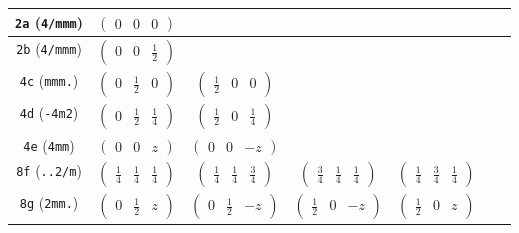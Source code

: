\documentclass[fleqn,9pt,landscape]{jsarticle}
\begin{document}
\begin{center}
\begin{longtable}{ccccccc}
{\tt 2a} ({\tt 4/mmm}) & $ \begin{pmatrix} 0 & 0 & 0 \end{pmatrix} $ & $  $ & $  $ & $  $ & $  $ & $  $ \\ \hline
{\tt 2b} ({\tt 4/mmm}) & $ \begin{pmatrix} 0 & 0 & \frac{1}{2} \end{pmatrix} $ & $  $ & $  $ & $  $ & $  $ & $  $ \\ \hline
{\tt 4c} ({\tt mmm.}) & $ \begin{pmatrix} 0 & \frac{1}{2} & 0 \end{pmatrix} $ & $ \begin{pmatrix} \frac{1}{2} & 0 & 0 \end{pmatrix} $ & $  $ & $  $ & $  $ & $  $ \\ \hline
{\tt 4d} ({\tt -4m2}) & $ \begin{pmatrix} 0 & \frac{1}{2} & \frac{1}{4} \end{pmatrix} $ & $ \begin{pmatrix} \frac{1}{2} & 0 & \frac{1}{4} \end{pmatrix} $ & $  $ & $  $ & $  $ & $  $ \\ \hline
{\tt 4e} ({\tt 4mm}) & $ \begin{pmatrix} 0 & 0 & z \end{pmatrix} $ & $ \begin{pmatrix} 0 & 0 & - z \end{pmatrix} $ & $  $ & $  $ & $  $ & $  $ \\ \hline
{\tt 8f} ({\tt ..2/m}) & $ \begin{pmatrix} \frac{1}{4} & \frac{1}{4} & \frac{1}{4} \end{pmatrix} $ & $ \begin{pmatrix} \frac{1}{4} & \frac{1}{4} & \frac{3}{4} \end{pmatrix} $ & $ \begin{pmatrix} \frac{3}{4} & \frac{1}{4} & \frac{1}{4} \end{pmatrix} $ & $ \begin{pmatrix} \frac{1}{4} & \frac{3}{4} & \frac{1}{4} \end{pmatrix} $ & $  $ & $  $ \\ \hline
{\tt 8g} ({\tt 2mm.}) & $ \begin{pmatrix} 0 & \frac{1}{2} & z \end{pmatrix} $ & $ \begin{pmatrix} 0 & \frac{1}{2} & - z \end{pmatrix} $ & $ \begin{pmatrix} \frac{1}{2} & 0 & - z \end{pmatrix} $ & $ \begin{pmatrix} \frac{1}{2} & 0 & z \end{pmatrix} $ & $  $ & $  $ \\ \hline

\end{longtable}
\end{center}
\end{document}
